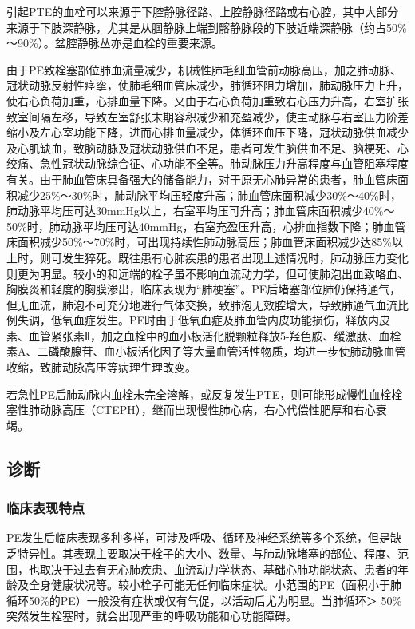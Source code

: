 引起PTE的血栓可以来源于下腔静脉径路、上腔静脉径路或右心腔，其中大部分来源于下肢深静脉，尤其是从腘静脉上端到髂静脉段的下肢近端深静脉（约占50\%～90\%）。盆腔静脉丛亦是血栓的重要来源。

由于PE致栓塞部位肺血流量减少，机械性肺毛细血管前动脉高压，加之肺动脉、冠状动脉反射性痉挛，使肺毛细血管床减少，肺循环阻力增加，肺动脉压力上升，使右心负荷加重，心排血量下降。又由于右心负荷加重致右心压力升高，右室扩张致室间隔左移，导致左室舒张末期容积减少和充盈减少，使主动脉与右室压力阶差缩小及左心室功能下降，进而心排血量减少，体循环血压下降，冠状动脉供血减少及心肌缺血，致脑动脉及冠状动脉供血不足，患者可发生脑供血不足、脑梗死、心绞痛、急性冠状动脉综合征、心功能不全等。肺动脉压力升高程度与血管阻塞程度有关。由于肺血管床具备强大的储备能力，对于原无心肺异常的患者，肺血管床面积减少25\%～30\%时，肺动脉平均压轻度升高；肺血管床面积减少30\%～40\%时，肺动脉平均压可达30mmHg以上，右室平均压可升高；肺血管床面积减少40\%～50\%时，肺动脉平均压可达40mmHg，右室充盈压升高，心排血指数下降；肺血管床面积减少50\%～70\%时，可出现持续性肺动脉高压；肺血管床面积减少达85\%以上时，则可发生猝死。既往患有心肺疾患的患者出现上述情况时，肺动脉压力变化则更为明显。较小的和远端的栓子虽不影响血流动力学，但可使肺泡出血致咯血、胸膜炎和轻度的胸膜渗出，临床表现为“肺梗塞”。PE后堵塞部位肺仍保持通气，但无血流，肺泡不可充分地进行气体交换，致肺泡无效腔增大，导致肺通气血流比例失调，低氧血症发生。PE时由于低氧血症及肺血管内皮功能损伤，释放内皮素、血管紧张素Ⅱ，加之血栓中的血小板活化脱颗粒释放5-羟色胺、缓激肽、血栓素A、二磷酸腺苷、血小板活化因子等大量血管活性物质，均进一步使肺动脉血管收缩，致肺动脉高压等病理生理改变。

若急性PE后肺动脉内血栓未完全溶解，或反复发生PTE，则可能形成慢性血栓栓塞性肺动脉高压（CTEPH），继而出现慢性肺心病，右心代偿性肥厚和右心衰竭。

\subsection{诊断}

\subsubsection{临床表现特点}

PE发生后临床表现多种多样，可涉及呼吸、循环及神经系统等多个系统，但是缺乏特异性。其表现主要取决于栓子的大小、数量、与肺动脉堵塞的部位、程度、范围，也取决于过去有无心肺疾患、血流动力学状态、基础心肺功能状态、患者的年龄及全身健康状况等。较小栓子可能无任何临床症状。小范围的PE（面积小于肺循环50\%的PE）一般没有症状或仅有气促，以活动后尤为明显。当肺循环＞
50\%突然发生栓塞时，就会出现严重的呼吸功能和心功能障碍。


